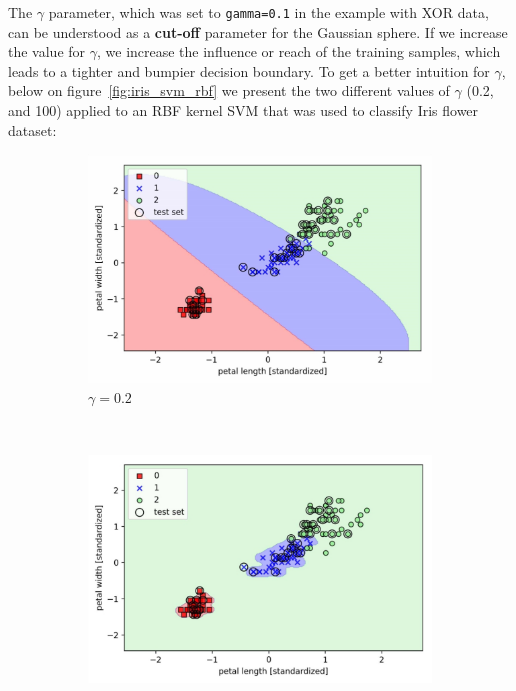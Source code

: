 \documentclass[11pt]{article}
\begin{document}
    The $\gamma$ parameter, which was set to \texttt{gamma=0.1} in the example with XOR data, can be understood as a \textbf{cut-off} parameter for the Gaussian sphere. If we increase the value for $\gamma$, we increase the influence or reach of the training samples, which leads to a tighter and bumpier decision boundary. To get a better intuition for $\gamma$, below on figure~\ref{fig:iris_svm_rbf} we present the two different values of $\gamma$ (0.2, and 100) applied to an RBF kernel SVM that was used to classify Iris flower dataset:

    \begin{figure}[hbt!]
        \centering
        \begin{subfigure}[t]{.48\textwidth}
            \centering
            \includegraphics[width=\columnwidth]{svm/img/iris_svm_gamma_02.png}
            \caption{$\gamma=0.2$}
            \label{fig:iris_svm_gamma_0.2}
        \end{subfigure}
        ~ %
        \begin{subfigure}[t]{.48\textwidth}
            \centering
            \includegraphics[width=\columnwidth]{svm/img/iris_svm_gamma_100.png}

\end{subfigure}
\end{figure}
\end{document}
